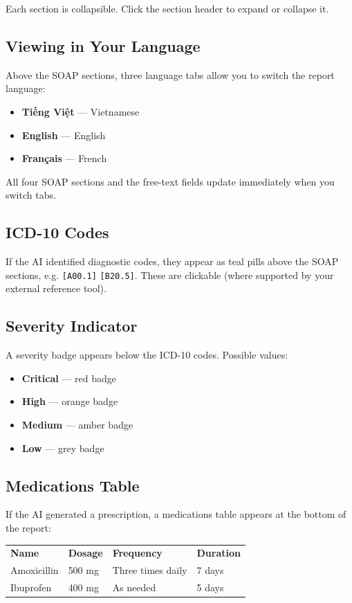 \documentclass[12pt,a4paper]{article}
\begin{document}
Each section is collapsible. Click the section header to expand or collapse it.

\subsection{Viewing in Your Language}
Above the SOAP sections, three language tabs allow you to switch the report language:
\begin{itemize}
	\item \textbf{Tiếng Việt} — Vietnamese
	\item \textbf{English} — English
	\item \textbf{Français} — French
\end{itemize}
All four SOAP sections and the free-text fields update immediately when you switch tabs.

\subsection{ICD-10 Codes}
If the AI identified diagnostic codes, they appear as teal pills above the SOAP sections,
e.g. \texttt{[A00.1]} \texttt{[B20.5]}. These are clickable (where supported by your
external reference tool).

\subsection{Severity Indicator}
A severity badge appears below the ICD-10 codes. Possible values:
\begin{itemize}
	\item \textbf{Critical} — red badge
	\item \textbf{High} — orange badge
	\item \textbf{Medium} — amber badge
	\item \textbf{Low} — grey badge
\end{itemize}

\subsection{Medications Table}
If the AI generated a prescription, a medications table appears at the bottom of the report:

\begin{tabular}{m{3cm}m{3cm}m{3cm}m{3cm}}
	\textbf{Name} & \textbf{Dosage} & \textbf{Frequency} & \textbf{Duration} \\
	Amoxicillin   & 500 mg          & Three times daily  & 7 days            \\
	Ibuprofen     & 400 mg          & As needed          & 5 days            \\
\end{tabular}
\end{document}
